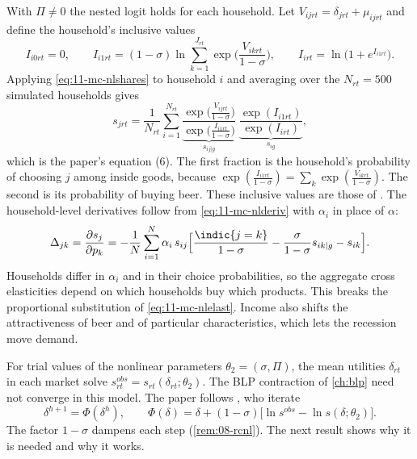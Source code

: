 With $\Pi \neq 0$ the nested logit holds for each household. Let $V_{ijrt} = \delta_{jrt} + \mu_{ijrt}$ and define the
household's inclusive values
\begin{equation}\label{eq:11-mc-ivi}
  I_{i0rt} = 0, \qquad I_{i1rt} = (1-\sigma)\ln\sum_{k=1}^{J_{rt}}\exp\Big(\frac{V_{ikrt}}{1-\sigma}\Big), \qquad
  I_{irt} = \ln\big(1 + e^{I_{i1rt}}\big).
\end{equation}
Applying \eqref{eq:11-mc-nlshares} to household $i$ and averaging over the $N_{rt} = 500$ simulated households gives
\begin{equation}\label{eq:11-mc-rcnlshare}
  s_{jrt} = \frac{1}{N_{rt}}\sum_{i=1}^{N_{rt}}
  \underbrace{\frac{\exp\big(\frac{V_{ijrt}}{1-\sigma}\big)}{\exp\big(\frac{I_{i1rt}}{1-\sigma}\big)}}_{s_{ij|g}}\;
  \underbrace{\frac{\exp(I_{i1rt})}{\exp(I_{irt})}}_{s_{ig}},
\end{equation}
which is the paper's equation (6). The first fraction is the household's probability of choosing $j$ among inside
goods, because $\exp(\frac{I_{i1rt}}{1-\sigma}) = \sum_k \exp(\frac{V_{ikrt}}{1-\sigma})$. The second is its
probability of buying beer. These inclusive values are those of \citet{McFadden1978}. The household-level derivatives
follow from \eqref{eq:11-mc-nlderiv} with $\alpha_i$ in place of $\alpha$:
\begin{equation}\label{eq:11-mc-rcnlderiv}
  \Delta_{jk} = \frac{\partial s_j}{\partial p_k} = -\frac{1}{N}\sum_{i=1}^{N}\alpha_i\, s_{ij}
  \Big[\frac{\indic\{j=k\}}{1-\sigma} - \frac{\sigma}{1-\sigma}s_{ik|g} - s_{ik}\Big].
\end{equation}
Households differ in $\alpha_i$ and in their choice probabilities, so the aggregate cross elasticities depend on
which households buy which products. This breaks the proportional substitution of \eqref{eq:11-mc-nlelast}. Income
also shifts the attractiveness of beer and of particular characteristics, which lets the recession move demand.

For trial values of the nonlinear parameters $\theta_2 = (\sigma, \Pi)$, the mean utilities $\delta_{rt}$ in each
market solve $s^{obs}_{rt} = s_{rt}(\delta_{rt};\theta_2)$. The BLP contraction of \cref{ch:blp} need not converge
in this model. The paper follows \citet{GrigolonVerboven2014}, who iterate
\begin{equation}\label{eq:11-mc-contraction}
  \delta^{h+1} = \Phi(\delta^h), \qquad \Phi(\delta) = \delta + (1-\sigma)\big[\ln s^{obs} - \ln s(\delta;\theta_2)\big].
\end{equation}
The factor $1-\sigma$ dampens each step (\cref{rem:08-rcnl}). The next result shows why it is needed and why it works.

